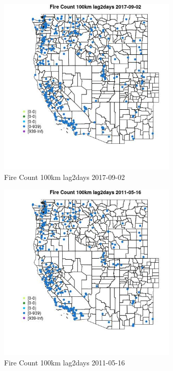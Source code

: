 \begin{figure} 
\centering  
\includegraphics[width=0.77\textwidth]{Code_Outputs/Report_ML_input_PM25_Step4_part_e_de_duplicated_aves_compiled_2019-05-21wNAs_MapObsFire_Count_100km_lag2days2017-09-02.jpg} 
\caption{\label{fig:Report_ML_input_PM25_Step4_part_e_de_duplicated_aves_compiled_2019-05-21wNAsMapObsFire_Count_100km_lag2days2017-09-02}Fire Count 100km lag2days 2017-09-02} 
\end{figure} 
 

\clearpage 

\begin{figure} 
\centering  
\includegraphics[width=0.77\textwidth]{Code_Outputs/Report_ML_input_PM25_Step4_part_e_de_duplicated_aves_compiled_2019-05-21wNAs_MapObsFire_Count_100km_lag2days2011-05-16.jpg} 
\caption{\label{fig:Report_ML_input_PM25_Step4_part_e_de_duplicated_aves_compiled_2019-05-21wNAsMapObsFire_Count_100km_lag2days2011-05-16}Fire Count 100km lag2days 2011-05-16} 
\end{figure} 
 

